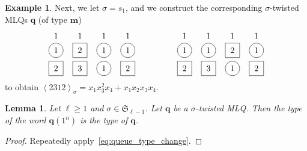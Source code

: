 \documentclass[reqno]{amsart}
\newcommand{\0}{\phantom{c}}
\newcommand{\swt}[1]{\left\langle #1 \right\rangle} %
\newcommand{\SymGp}[1]{\mathfrak{S}_{#1}} %
\newcommand{\mm}{\mathbf{m}}
\newcommand{\qq}{\mathbf{q}}
\newenvironment{vershort}{}{}
\theoremstyle{plain}
\newtheorem{lemma}[thm]{Lemma}
\theoremstyle{definition}
\newtheorem{example}[thm]{Example}
\numberwithin{equation}{section}
\begin{document}
\begin{example}
Next, we let $\sigma = s_1$,
and we construct the corresponding $\sigma$-twisted MLQs $\qq$ (of type $\mm$)
\[
\begin{tikzpicture}[baseline=-30]
  \def\ll{0.75}   %
  \foreach \i in {1,3,4} { \draw (\i,\ll*-1) circle (0.3); }
  \foreach \i in {2} { \draw (\i-.3,\ll*-1 -.3) rectangle +(0.6,+0.6); }
  \foreach \i in {3} { \draw (\i,\ll*-2) circle (0.3); }
  \foreach \i in {1,2,4} { \draw (\i-.3,\ll*-2 -.3) rectangle +(0.6,+0.6); }
  \foreach \i in {1,2,3,4} { \node at (\i, \ll*0-.15) {$1$}; }
  \foreach \i in {1,3,4} { \node at (\i, \ll*-1) {$1$}; }
  \foreach \i in {2} { \node at (\i, \ll*-1) {$2$}; }
  \foreach \i in {3} { \node at (\i, \ll*-2) {$1$}; }
  \foreach \i in {1,4} { \node at (\i, \ll*-2) {$2$}; }
  \foreach \i in {2} { \node at (\i, \ll*-2) {$3$}; }
\end{tikzpicture}
\hspace{50pt}
\begin{tikzpicture}[baseline=-30]
  \def\ll{0.75}   %
  \foreach \i in {1,2,4} { \draw (\i,\ll*-1) circle (0.3); }
  \foreach \i in {3} { \draw (\i-.3,\ll*-1 -.3) rectangle +(0.6,+0.6); }
  \foreach \i in {3} { \draw (\i,\ll*-2) circle (0.3); }
  \foreach \i in {1,2,4} { \draw (\i-.3,\ll*-2 -.3) rectangle +(0.6,+0.6); }
  \foreach \i in {1,2,3,4} { \node at (\i, \ll*0-.15) {$1$}; }
  \foreach \i in {1,2,4} { \node at (\i, \ll*-1) {$1$}; }
  \foreach \i in {3} { \node at (\i, \ll*-1) {$2$}; }
  \foreach \i in {3} { \node at (\i, \ll*-2) {$1$}; }
  \foreach \i in {1,4} { \node at (\i, \ll*-2) {$2$}; }
  \foreach \i in {2} { \node at (\i, \ll*-2) {$3$}; }
\end{tikzpicture}
\]
to obtain $\swt{2312}_{\sigma} = x_1 x_3^2 x_4 + x_1 x_2 x_3 x_4$.
\end{example}

\begin{lemma}
\label{lemma:mlq-type}
Let $\ell \geq 1$ and $\sigma \in \SymGp{\ell-1}$.
Let $\qq$ be a $\sigma$-twisted MLQ.
Then the type of the word $\qq(1^n)$ is the type of $\qq$.
\end{lemma}

\begin{vershort}
\begin{proof}
Repeatedly apply~\eqref{eq:queue_type_change}.
\end{proof}
\end{vershort}
\end{document}
